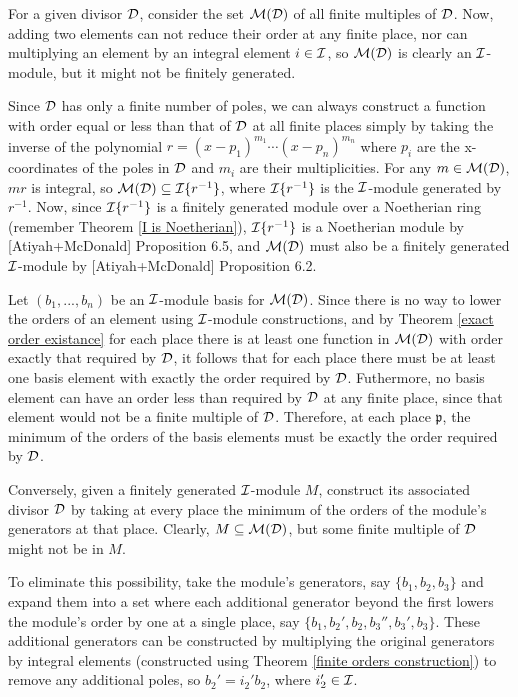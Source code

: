 \proof

For a given divisor ${\cal D}$, consider the set ${\cal M}({\cal D})$
of all finite multiples of ${\cal D}$.
Now, adding two
elements can not reduce their order at any finite place, nor can
multiplying an element by an integral element $i \in {\cal I}$, so
${\cal M}({\cal D})$ is clearly an ${\cal I}$-module, but it
might not be finitely generated.

Since ${\cal D}$ has only a finite number of poles, we can always
construct a function with order equal or less than that of ${\cal D}$
at all finite places simply by taking the inverse of the polynomial
$r=(x-p_1)^{m_1} \cdots (x-p_n)^{m_n}$ where $p_i$ are the x-coordinates
of the poles in ${\cal D}$ and $m_i$ are their multiplicities.
For any $m \in {\cal M}({\cal D})$, $mr$ is integral, so ${\cal M}({\cal D})
\subseteq {\cal I}\{r^{-1}\}$, where ${\cal I}\{r^{-1}\}$ is the ${\cal I}$-module
generated by $r^{-1}$.  Now, since ${\cal I}\{r^{-1}\}$ is a finitely
generated module over a Noetherian ring (remember Theorem \ref{I is
Noetherian}), ${\cal I}\{r^{-1}\}$ is a Noetherian module by
[Atiyah+McDonald] Proposition 6.5, and ${\cal M}({\cal D})$ must also
be a finitely generated ${\cal I}$-module by [Atiyah+McDonald]
Proposition 6.2.

Let $(b_1,...,b_n)$ be an ${\cal I}$-module basis for ${\cal M}({\cal
D})$.  Since there is no way to lower the orders of an element using
${\cal I}$-module constructions, and by Theorem \ref{exact order
existance} for each place there is at least one function in ${\cal
M}({\cal D})$ with order exactly that required by ${\cal D}$, it
follows that for each place there must be at least one basis element
with exactly the order required by ${\cal D}$.  Futhermore, no basis
element can have an order less than required by ${\cal D}$ at any
finite place, since that element would not be a finite multiple of
${\cal D}$.  Therefore, at each place $\mathfrak{p}$, the minimum of
the orders of the basis elements must be exactly the order required by
${\cal D}$.

Conversely, given a finitely generated ${\cal I}$-module $M$,
construct its associated divisor ${\cal D}$ by taking at every place
the minimum of the orders of the module's generators at that place.
Clearly, $M \subseteq {\cal M}({\cal D})$, but some finite multiple of
${\cal D}$ might not be in $M$.

To eliminate this possibility, take the module's generators, say
$\{b_1, b_2, b_3\}$ and expand them into a set where each additional
generator beyond the first lowers the module's order by one at a
single place, say $\{b_1, b_2', b_2, b_3'', b_3', b_3\}$.  These
additional generators can be constructed by multiplying the original
generators by integral elements (constructed using Theorem \ref{finite
orders construction}) to remove any additional poles, so $b_2' = i_2'
b_2$, where $i_2' \in {\cal I}$.

